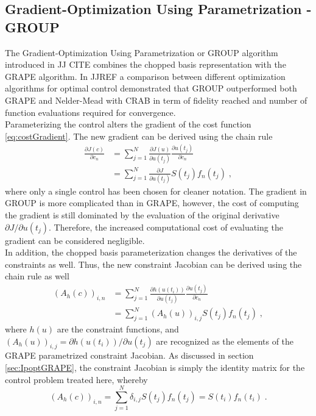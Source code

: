 \subsection{Gradient-Optimization Using Parametrization - GROUP}
The Gradient-Optimization Using Parametrization or \textsc{GROUP} algorithm introduced in JJ CITE combines the chopped basis representation with the \textsc{GRAPE} algorithm. In JJREF a comparison between different optimization algorithms for optimal control demonstrated that \textsc{GROUP} outperformed both \textsc{GRAPE} and Nelder-Mead with \textsc{CRAB} in term of fidelity reached and number of function evaluations required for convergence. \\
Parameterizing the control alters the gradient of the cost function \eqref{eq:costGradient}. The new gradient can be derived using the chain rule
\begin{align}
	\frac{\partial J (c)}{\partial c_n} &= \sum_{j = 1}^{N} \frac{\partial J (u)}{\partial u(t_j)} \frac{\partial u(t_j)}{\partial c_n} \nonumber \\
	&= \sum_{j = 1}^{N} \frac{\partial J }{\partial u(t_j)} S(t_j) f_n(t_j) \; , \label{eq:GROUPgradient} 
\end{align}
where only a single control has been chosen for cleaner notation. The gradient in \textsc{GROUP} is more complicated than in \textsc{GRAPE}, however, the cost of computing the gradient is still dominated by the evaluation of the original derivative ${\partial J }/{\partial u(t_j)}$. Therefore, the increased computational cost of evaluating the gradient can be considered negligible.\\
In addition, the chopped basis parameterization changes the derivatives of the constraints as well. Thus, the new constraint Jacobian can be derived using the chain rule as well
\begin{align}
	(A_h (c))_{i,n}  &= \sum_{j = 1}^{N} \frac{\partial h(u (t_i)) }{\partial u(t_j)} \frac{\partial u(t_j)}{\partial c_n} \nonumber \\
	&= \sum_{j = 1}^{N} (A_h (u))_{i,j} S(t_j) f_n (t_j) \; , \label{eq:GROUPconstJacobian} 
\end{align}
where $h(u)$ are the constraint functions, and $(A_h (u))_{i,j} = {\partial h(u (t_i)) } / {\partial u(t_j)}$ are recognized as the elements of the GRAPE parametrized constraint Jacobian. As discussed in section \ref{sec:IpoptGRAPE}, the constraint Jacobian is simply the identity matrix for the control problem treated here, whereby 
\begin{equation}
	(A_h (c))_{i,n} = \sum_{j = 1}^{N} \delta_{i,j} S(t_j) f_n (t_j) = S(t_i) f_n (t_i) \; .
\end{equation} 
